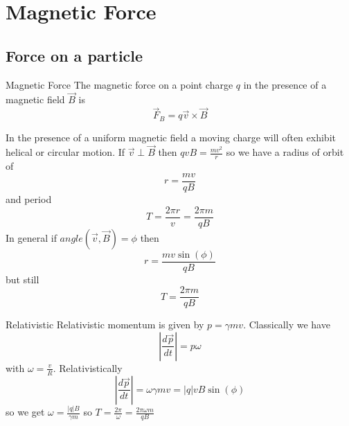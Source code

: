 \documentclass[12pt]{report}
\begin{document}
\chapter{Magnetic Force}


\section{Force on a particle}

\begin{defn}{Magnetic Force}{}
        The magnetic force on a point charge $q$ in the presence of a magnetic field $\vec{B}$ is \begin{equation}
                \vec{F}_B = q\vec{v} \times \vec{B}
        \end{equation}
\end{defn}

\begin{rmk}{}{}
        In the presence of a uniform magnetic field a moving charge will often exhibit helical or circular motion. If $\vec{v}\perp\vec{B}$ then $qvB = \frac{mv^2}{r}$ so we have a radius of orbit of \begin{equation}
                r = \frac{mv}{qB}
        \end{equation}
        and period \begin{equation}
                T = \frac{2\pi r}{v} = \frac{2\pi m}{qB}
        \end{equation}
        In general if $angle(\vec{v},\vec{B}) = \phi$ then \begin{equation}
                r = \frac{mv\sin(\phi)}{qB}
        \end{equation}
        but still \begin{equation}
                T = \frac{2\pi m}{qB}
        \end{equation}
\end{rmk}


\begin{defn}{Relativistic}{}
        Relativistic momentum is given by $p = \gamma mv$. Classically we have \begin{equation}
                \left|\frac{d\vec{p}}{dt}\right| = p\omega
        \end{equation}
        with $\omega = \frac{v}{R}$. Relativistically \begin{equation}
                \left|\frac{d\vec{p}}{dt}\right| = \omega\gamma m v = |q| vB\sin(\phi)
        \end{equation}
        so we get $\omega = \frac{|q|B}{\gamma m}$ so $T = \frac{2\pi}{\omega} = \frac{2\pi\omega m}{qB}$
\end{defn}
\end{document}
